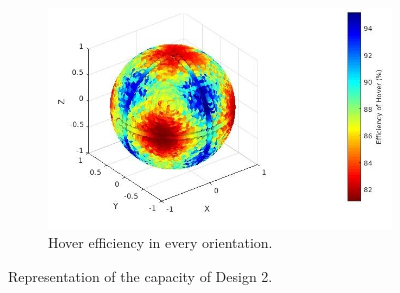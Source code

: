\begin{figure}[!h]
{\begin{subfigure}[b]{0.5\textwidth}
  \end{subfigure}
  \begin{subfigure}[b]{0.45\textwidth}
    \includegraphics[width=\linewidth]{images/Quad_design_2_hspace.jpg}
    \caption{Hover efficiency in every orientation.} \label{fig:deisgn2_hspace}
  \end{subfigure}}
  \caption{Representation of the capacity of Design 2.}
  \label{fig:Quadcopter2_spaces}
\end{figure}

\begin{table}[!h]
\begin{center}
 \caption{Comparison between two optimal design force-wise.}\vspace{1ex}
 \label{tab:tab_Quad_compare_force}
\end{center}
\end{table}

\begin{table}[!h]
\begin{center}
 \caption{Comparison between two optimal design torque-wise.}\vspace{1ex}
 \label{tab:tab_Quad_compare_torque}
\end{center}
\end{table}

